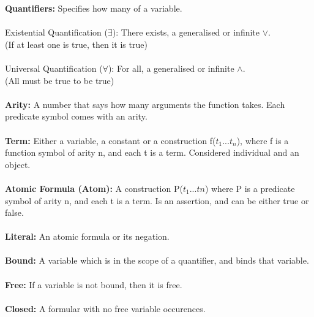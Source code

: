 \documentclass[a4paper,10pt]{article}
\begin{document}
\noindent \textcolor{RoyalPurple}{\textbf{Quantifiers:}} Specifies how many of a variable.\\ \\
\indent \textcolor{RoyalPurple}{Existential Quantification ($\exists$):} There exists, a generalised or infinite $\lor$. \\
\indent (If at least one is true, then it is true)\\ \\
\indent \textcolor{RoyalPurple}{Universal Quantification ($\forall$):} For all, a generalised or infinite $\land$. \\
\indent (All must be true to be true)\\ \\
\noindent \textcolor{RoyalPurple}{\textbf{Arity:}} A number that says how many arguments the function takes. Each predicate symbol comes with an arity.\\ \\
\noindent \textcolor{RoyalPurple}{\textbf{Term:}} Either a variable, a constant or a construction f($t_{1}...t_{n}$), where f is a function symbol of arity n, and each t is a term. Considered individual and an object.\\ \\
\noindent \textcolor{RoyalPurple}{\textbf{Atomic Formula (Atom):}} A construction P($t_{1}...t{n}$) where P is a predicate symbol of arity n, and each t is a term. Is an assertion, and can be either true or false.\\ \\
\noindent \textcolor{RoyalPurple}{\textbf{Literal:}} An atomic formula or its negation.\\ \\
\noindent \textcolor{RoyalPurple}{\textbf{Bound:}} A variable which is in the scope of a quantifier, and binds that variable.\\ \\
\noindent \textcolor{RoyalPurple}{\textbf{Free:}} If a variable is not bound, then it is free.\\ \\
\noindent \textcolor{RoyalPurple}{\textbf{Closed:}} A formular with no free variable occurences.\\ \\
\newpage 
\end{document}
